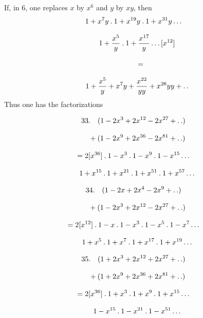 \begingroup
\renewcommand{\arraystretch}{1.45}

If, in 6, one replaces $x$ by $x^{6}$ and $y$ by $xy$, then
\[
\begin{gathered}
1+x^{7}y\mathbin{.}1+x^{19}y\mathbin{.}1+x^{31}y\mathinner{.\,.\,.}\\[8pt]\quad{}1+\frac{x^{5}}{y}\mathbin{.}1+\frac{x^{17}}{y}\mathinner{.\,.\,.}[x^{12}]\\[8pt]
\qquad=\\[8pt]\quad{}1+\frac{x^{5}}{y}+x^{7}y+\frac{x^{22}}{yy}+x^{26}yy+\mathinner{.\,.}
\end{gathered}
\]
Thus one has the factorizations

\[
\begin{gathered}
33.\quad (1-2x^{3}+2x^{12}-2x^{27}+\mathinner{.\,.})\\[8pt]\quad{}+(1-2x^{9}+2x^{36}-2x^{81}+\mathinner{.\,.})\\[8pt]
 =2[x^{36}]\mathbin{.}1-x^{3}\mathbin{.}1-x^{9}\mathbin{.}1-x^{15}\mathinner{.\,.\,.}\\[8pt]\quad{}
 1+x^{15}\mathbin{.}1+x^{21}\mathbin{.}1+x^{51}\mathbin{.}1+x^{57}\mathinner{.\,.\,.}
\end{gathered}
\]

\[
\begin{gathered}
34.\quad (1-2x+2x^{4}-2x^{9}+\mathinner{.\,.})\\[8pt]\quad{}+(1-2x^{3}+2x^{12}-2x^{27}+\mathinner{.\,.})\\[8pt]
 =2[x^{12}]\mathbin{.}1-x\mathbin{.}1-x^{3}\mathbin{.}1-x^{5}\mathbin{.}1-x^{7}\mathinner{.\,.\,.}\\[8pt]\quad{}
 1+x^{5}\mathbin{.}1+x^{7}\mathbin{.}1+x^{17}\mathbin{.}1+x^{19}\mathinner{.\,.\,.}
\end{gathered}
\]

\[
\begin{gathered}
35.\quad (1+2x^{3}+2x^{12}+2x^{27}+\mathinner{.\,.})\\[8pt]\quad{}+(1+2x^{9}+2x^{36}+2x^{81}+\mathinner{.\,.})\\[8pt]
 =2[x^{36}]\mathbin{.}1+x^{3}\mathbin{.}1+x^{9}\mathbin{.}1+x^{15}\mathinner{.\,.\,.}\\[8pt]\quad{}
 1-x^{15}\mathbin{.}1-x^{21}\mathbin{.}1-x^{51}\mathinner{.\,.\,.}
\end{gathered}
\]

